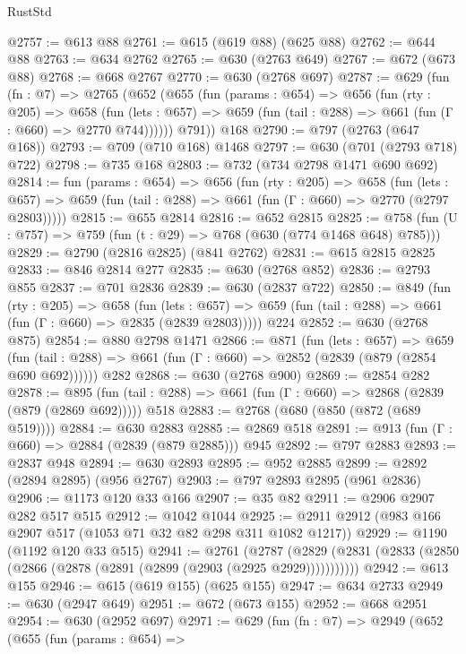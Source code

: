 \begin{lexlean}{RustStd}
\begin{coremodule}
{\begin{coremodule}
{{{{{{{{{{@2757 := @613 @88
@2761 := @615 (@619 @88) (@625 @88)
@2762 := @644 @88
@2763 := @634 @2762
@2765 := @630 (@2763 @649)
@2767 := @672 (@673 @88)
@2768 := @668 @2767
@2770 := @630 (@2768 @697)
@2787 := @629
    (fun (fn : @7) =>
    @2765
      (@652
        (@655
          (fun (params : @654) =>
          @656
            (fun (rty : @205) =>
            @658
              (fun (lets : @657) =>
              @659 (fun (tail : @288) => @661 (fun (Γ : @660) => @2770 @744))))))
        @791))
    @168
@2790 := @797 (@2763 (@647 @168))
@2793 := @709 (@710 @168) @1468
@2797 := @630 (@701 (@2793 @718) @722)
@2798 := @735 @168
@2803 := @732 (@734 @2798 @1471 @690 @692)
@2814 := fun (params : @654) =>
  @656
    (fun (rty : @205) =>
    @658
      (fun (lets : @657) =>
      @659 (fun (tail : @288) => @661 (fun (Γ : @660) => @2770 (@2797 @2803)))))
@2815 := @655 @2814
@2816 := @652 @2815
@2825 := @758 (fun (U : @757) => @759 (fun (t : @29) => @768 (@630 (@774 @1468 @648) @785)))
@2829 := @2790 (@2816 @2825) (@841 @2762)
@2831 := @615 @2815 @2825
@2833 := @846 @2814 @277
@2835 := @630 (@2768 @852)
@2836 := @2793 @855
@2837 := @701 @2836
@2839 := @630 (@2837 @722)
@2850 := @849
    (fun (rty : @205) =>
    @658
      (fun (lets : @657) =>
      @659 (fun (tail : @288) => @661 (fun (Γ : @660) => @2835 (@2839 @2803)))))
    @224
@2852 := @630 (@2768 @875)
@2854 := @880 @2798 @1471
@2866 := @871
    (fun (lets : @657) =>
    @659 (fun (tail : @288) => @661 (fun (Γ : @660) => @2852 (@2839 (@879 (@2854 @690 @692))))))
    @282
@2868 := @630 (@2768 @900)
@2869 := @2854 @282
@2878 := @895 (fun (tail : @288) => @661 (fun (Γ : @660) => @2868 (@2839 (@879 (@2869 @692))))) @518
@2883 := @2768 (@680 (@850 (@872 (@689 @519))))
@2884 := @630 @2883
@2885 := @2869 @518
@2891 := @913 (fun (Γ : @660) => @2884 (@2839 (@879 @2885))) @945
@2892 := @797 @2883
@2893 := @2837 @948
@2894 := @630 @2893
@2895 := @952 @2885
@2899 := @2892 (@2894 @2895) (@956 @2767)
@2903 := @797 @2893 @2895 (@961 @2836)
@2906 := @1173 @120 @33 @166
@2907 := @35 @82
@2911 := @2906 @2907 @282 @517 @515
@2912 := @1042 @1044
@2925 := @2911 @2912 (@983 @166 @2907 @517 (@1053 @71 @32 @82 @298 @311 @1082 @1217))
@2929 := @1190 (@1192 @120 @33 @515)
@2941 := @2761
    (@2787 (@2829 (@2831 (@2833 (@2850 (@2866 (@2878 (@2891 (@2899 (@2903 (@2925 @2929)))))))))))
@2942 := @613 @155
@2946 := @615 (@619 @155) (@625 @155)
@2947 := @634 @2733
@2949 := @630 (@2947 @649)
@2951 := @672 (@673 @155)
@2952 := @668 @2951
@2954 := @630 (@2952 @697)
@2971 := @629
    (fun (fn : @7) =>
    @2949
      (@652
        (@655
          (fun (params : @654) =>
}}}}}}}}}}
\end{coremodule}}
\end{coremodule}
\end{lexlean}
